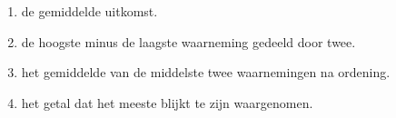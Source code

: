 \begin{enumerate}[label=(\alph*)]
    \item de gemiddelde uitkomst.
    \item de hoogste minus de laagste waarneming gedeeld door twee.
    \item het gemiddelde van de middelste twee waarnemingen na ordening.
    \item het getal dat het meeste blijkt te zijn waargenomen.
\end{enumerate}
